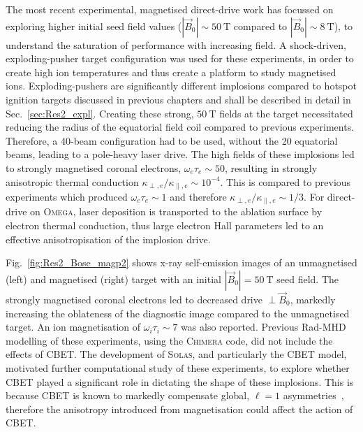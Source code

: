 The most recent experimental, magnetised direct-drive work has focussed on exploring higher initial seed field values ($|\vec{B}_0|\sim50\ \text{T}$ compared to $|\vec{B}_0|\sim8\ \text{T}$), to understand the saturation of performance with increasing field.
A shock-driven, exploding-pusher target configuration was used for these experiments, in order to create high ion temperatures and thus create a platform to study magnetised ions.
Exploding-pushers are significantly different implosions compared to hotspot ignition targets discussed in previous chapters and shall be described in detail in Sec.~\ref{sec:Res2_expl}.
Creating these strong, $50\ \text{T}$ fields at the target necessitated reducing the radius of the equatorial field coil compared to previous experiments.
Therefore, a 40-beam configuration had to be used, without the 20 equatorial beams, leading to a pole-heavy laser drive.
The high fields of these implosions led to strongly magnetised coronal electrons, $\omega_e\tau_e\sim50$, resulting in strongly anisotropic thermal conduction $\kappa_{\perp,e}/\kappa_{\parallel,e}\sim10^{-4}$.
This is compared to previous experiments which produced $\omega_e\tau_e\sim1$ and therefore $\kappa_{\perp,e}/\kappa_{\parallel,e}\sim1/3$.
For direct-drive on \textsc{Omega}, laser deposition is transported to the ablation surface by electron thermal conduction, thus large electron Hall parameters led to an effective anisotropisation of the implosion drive.

Fig.~\ref{fig:Res2_Bose_magp2} shows x-ray self-emission images of an unmagnetised (left) and magnetised (right) target with an initial $|\vec{B}_0|=50\ \text{T}$ seed field.
The strongly magnetised coronal electrons led to decreased drive $\perp\vec{B}_0$, markedly increasing the oblateness of the diagnostic image compared to the unmagnetised target.
An ion magnetisation of $\omega_i\tau_i\sim7$ was also reported.
Previous \ac{Rad-MHD} modelling of these experiments, using the \textsc{Chimera} code, did not include the effects of \ac{CBET}.
The development of \textsc{Solas}, and particularly the \ac{CBET} model, motivated further computational study of these experiments, to explore whether \ac{CBET} played a significant role in dictating the shape of these implosions.
This is because \ac{CBET} is known to markedly compensate global, $\ell=1$ asymmetries~\cite{anderson_effect_2020,colaitis_inverse_2021}, therefore the anisotropy introduced from magnetisation could affect the action of \ac{CBET}.

